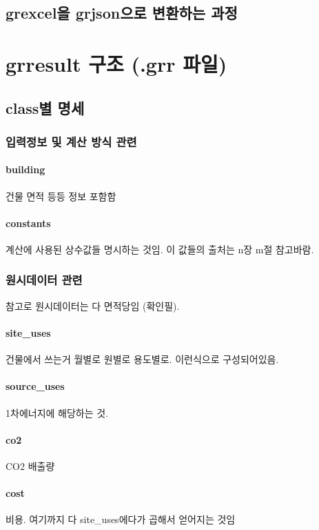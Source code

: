 \subsection{grexcel을 grjson으로 변환하는 과정}


\section{grresult 구조 (.grr 파일)}
\subsection{class별 명세}
\subsubsection{입력정보 및 계산 방식 관련}
\paragraph{building} 건물 면적 등등 정보 포함함
\paragraph{constants} 계산에 사용된 상수값들 명시하는 것임. 이 값들의 출처는 n장 m절 참고바람.

\subsubsection{원시데이터 관련}
참고로 원시데이터는 다 면적당임 (확인필).
\paragraph{site\_uses} 건물에서 쓰는거 월별로 원별로 용도별로. 이런식으로 구성되어있음.
\paragraph{source\_uses} 1차에너지에 해당하는 것.
\paragraph{co2} CO2 배출량
\paragraph{cost} 비용. 여기까지 다 site\_uses에다가 곱해서 얻어지는 것임

